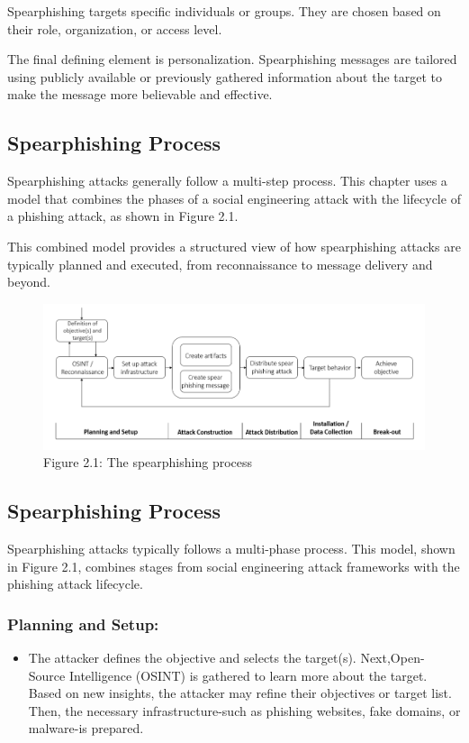 Spearphishing targets specific individuals or groups. They are chosen based on their role, organization, or access level.

The final defining element is personalization. Spearphishing messages are tailored using publicly available or previously gathered information about the target to make the message more believable and effective.

\subsection{Spearphishing Process}
Spearphishing attacks generally follow a multi-step process. This chapter uses a model that combines the phases of a social engineering attack with the lifecycle of a phishing attack, as shown in Figure 2.1.

This combined model provides a structured view of how spearphishing attacks are typically planned and executed, from reconnaissance to message delivery and beyond.

\begin{figure}
    \centering
    \includegraphics[width=0.75\linewidth]{phishingproc.png}
    \caption{Figure 2.1: The spearphishing process}
    \label{fig:placeholder}
\end{figure}

\subsection{Spearphishing Process}
Spearphishing attacks typically follows a multi-phase process. This model, shown in Figure 2.1, combines stages from social engineering attack frameworks with the phishing attack lifecycle.
\subsubsection{Planning and Setup:}
\begin{itemize}
    \item The attacker defines the objective and selects the target(s). Next,Open-Source Intelligence (OSINT) is gathered to learn more about the target. Based on new insights, the attacker may refine their objectives or target list. Then, the necessary infrastructure-such as phishing websites, fake domains, or malware-is prepared.
\end{itemize}
